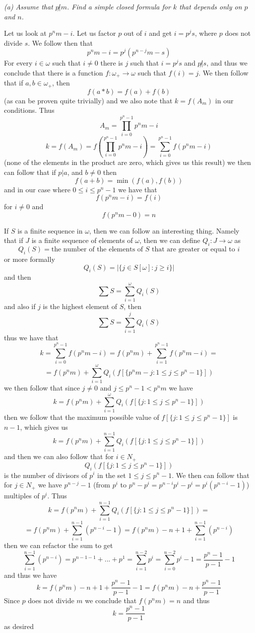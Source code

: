 \documentclass[11pt,oneside,titlepage]{book}
\newcommand{\set}[1]{\{ #1 \}}
\begin{document}
\textit{(a) Assume that $p \not | m$. Find a simple closed formula for $k$ that depends
  only on $p$ and $n$.}

Let us look at $p^nm - i$. Let us factor $p$ out of $i$
and get $i = p^js$, where $p$ does not divide $s$. We follow then that
$$p^nm - i = p^j(p^{n - j}m - s)$$
For every $i \in \omega$ such that $i \neq 0$ there is $j$ such that
$i = p^js$ and $p \not | s$,
and thus we conclude that there is a function $f: \omega_+ \to \omega$
such that $f(i) = j$. We then follow that if $a, b \in \omega_+$, then
$$f(a * b) = f(a) + f(b)$$
(as can be proven quite trivially) and we also note that $k = f(A_m)$
in our conditions. Thus
$$A_m = \prod_{i = 0}^{p^n - 1}{p^nm - i}$$
$$k = f(A_m) = f(\prod_{i = 0}^{p^n - 1}{p^nm - i}) = \sum_{i = 0}^{p^n - 1}{f(p^nm - i)}$$
(none of the elements in the product are zero, which gives us this
result) we then can follow that if $p | a$, and $b \neq 0$ then
$$f(a + b) = \min(f(a), f(b))$$
and in our case where $0 \leq i \leq p^n - 1$ we have that
$$f(p^nm - i) = f(i)$$
for $i \neq 0$ and
$$f(p^nm - 0) = n$$

If $S$ is a finite sequence in $\omega$, then we can follow an
interesting thing.  Namely that if $J$ is a finite sequence of
elements of $\omega$, then we can define $Q_i: J \to \omega$ as
$$Q_i(S) = \text{the number of the elements of $S$ that are greater or equal to }i$$
or more formally
$$Q_i(S) = |\set{j \in S[\omega]: j \geq i}|$$
and then
$$\sum{S} = \sum_{i = 1}^{\omega}{Q_i(S)}$$
and also if $j$ is the highest element of $S$, then
$$\sum{S} = \sum_{i = 1}^{j}{Q_i(S)}$$
thus we have that
$$k = \sum_{i = 0}^{p^n - 1}{f(p^nm - i)} = f(p^nm) + \sum_{i = 1}^{p^n - 1}{f(p^nm - i)} =$$
$$ = f(p^nm) + \sum_{i = 1}^{\omega}{Q_i(f[\set{p^nm - j: 1 \leq j \leq p^n - 1}])}$$
we then follow that since $j \neq 0$ and $j \leq p^n - 1 < p^nm$ we have
$$k = f(p^nm) + \sum_{i = 1}^{\omega}{Q_i(f[\set{j: 1 \leq j \leq p^n - 1}])}$$
then we follow that the maximum possible value of $ f[\set{j: 1 \leq j \leq p^n - 1}]$
is $n - 1$, which gives us
$$k = f(p^nm) + \sum_{i = 1}^{n - 1}{Q_i(f[\set{j: 1 \leq j \leq p^n - 1}])}$$
and then we can also follow that for $i \in N_+$
$$Q_i(f[\set{j: 1 \leq j \leq p^n - 1}])$$
is the number of divisors of $p^i$ in the set $1 \leq j \leq p^n - 1$.
We then can follow that for $j \in N_+$ we have $p^{n - j} - 1$ (from
$p^{i}$ to $p^n - p^i = p^{n - i}p^i - p^i = p^i(p^{n - i} - 1)$)
multiples of $p^i$. Thus
$$k = f(p^nm) + \sum_{i = 1}^{n - 1}{Q_i(f[\set{j: 1 \leq j \leq p^n - 1}])} = $$
$$ = 
f(p^nm) + \sum_{i = 1}^{n - 1}{(p^{n - i} - 1)} = f(p^nm) - n + 1 + \sum_{i = 1}^{n - 1}{(p^{n - i})}$$
then we can refactor the sum to get
$$\sum_{i = 1}^{n - 1}{(p^{n - i})} = p^{n - 1 - 1} + ... + p^1 = \sum_{i = 1}^{n - 2}{p^i} =
\sum_{i = 0}^{n - 2}{p^i} - 1 = \frac{p^{n} - 1}{p - 1} - 1$$
and thus we have
$$k = f(p^nm) - n + 1 + \frac{p^{n} - 1}{p - 1} - 1
= f(p^nm) - n  + \frac{p^{n} - 1}{p - 1}$$
Since $p$ does not divide $m$ we conclude that $f(p^nm)  = n$ and thus
$$k = \frac{p^{n} - 1}{p - 1}$$
as desired
\end{document}
